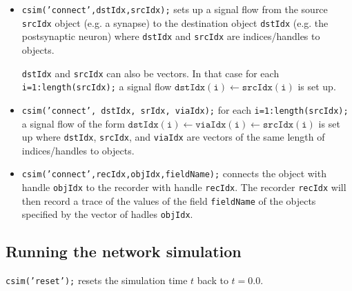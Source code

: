 \begin{itemize}
  
\item\texttt{csim('connect',dstIdx,srcIdx);} sets up a signal flow
  from the source \texttt{srcIdx} object (e.g. a synapse) to the
  destination object \texttt{dstIdx} (e.g. the postsynaptic neuron)
  where \texttt{dstIdx} and \texttt{srcIdx} are indices/handles to
  objects.
  
  \texttt{dstIdx} and \texttt{srcIdx} can also be vectors. In that
  case for each \texttt{i=1:length(srcIdx);} a signal flow
  $\mathtt{dstIdx(i)} \leftarrow \mathtt{srcIdx(i)}$ is set up.
  
\item\texttt{csim('connect', dstIdx, srIdx, viaIdx);} for each
  \texttt{i=1:length(srcIdx);} a signal flow of the form
  $\mathtt{dstIdx(i)} \leftarrow \mathtt{viaIdx(i)} \leftarrow
  \mathtt{srcIdx(i)}$ is set up where \texttt{dstIdx},
  \texttt{srcIdx}, and \texttt{viaIdx} are vectors of the same length
  of indices/handles to objects.
  
\item\texttt{csim('connect',recIdx,objIdx,fieldName);} connects the
  object with handle \texttt{objIdx} to the recorder with handle
  \texttt{recIdx}. The recorder \texttt{recIdx} will then record a
  trace of the values of the field \texttt{fieldName} of the objects
  specified by the vector of hadles \texttt{objIdx}.

\end{itemize}

\subsection{Running the network simulation}


\texttt{csim('reset');} resets the simulation time $t$ back to
$t=0.0$.

\label{cmd:simulate}

